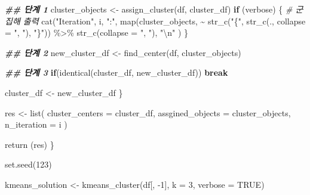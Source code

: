 \documentclass[
]{book}
\newenvironment{Shaded}{\begin{snugshade}}{\end{snugshade}}
\newcommand{\AttributeTok}[1]{\textcolor[rgb]{0.77,0.63,0.00}{#1}}
\newcommand{\CommentTok}[1]{\textcolor[rgb]{0.56,0.35,0.01}{\textit{#1}}}
\newcommand{\ConstantTok}[1]{\textcolor[rgb]{0.00,0.00,0.00}{#1}}
\newcommand{\ControlFlowTok}[1]{\textcolor[rgb]{0.13,0.29,0.53}{\textbf{#1}}}
\newcommand{\DecValTok}[1]{\textcolor[rgb]{0.00,0.00,0.81}{#1}}
\newcommand{\DocumentationTok}[1]{\textcolor[rgb]{0.56,0.35,0.01}{\textbf{\textit{#1}}}}
\newcommand{\FunctionTok}[1]{\textcolor[rgb]{0.00,0.00,0.00}{#1}}
\newcommand{\NormalTok}[1]{#1}
\newcommand{\OtherTok}[1]{\textcolor[rgb]{0.56,0.35,0.01}{#1}}
\newcommand{\SpecialCharTok}[1]{\textcolor[rgb]{0.00,0.00,0.00}{#1}}
\newcommand{\StringTok}[1]{\textcolor[rgb]{0.31,0.60,0.02}{#1}}
\begin{document}
\begin{Shaded}
\begin{Highlighting}[]
    \DocumentationTok{\#\# 단계 1}
\NormalTok{    cluster\_objects }\OtherTok{\textless{}{-}} \FunctionTok{assign\_cluster}\NormalTok{(df, cluster\_df)}
    \ControlFlowTok{if}\NormalTok{ (verbose) \{ }\CommentTok{\# 군집해 출력}
      \FunctionTok{cat}\NormalTok{(}\StringTok{"Iteration"}\NormalTok{, i, }\StringTok{":"}\NormalTok{, }
          \FunctionTok{map}\NormalTok{(cluster\_objects, }\SpecialCharTok{\textasciitilde{}} \FunctionTok{str\_c}\NormalTok{(}\StringTok{"\{"}\NormalTok{, }\FunctionTok{str\_c}\NormalTok{(., }\AttributeTok{collapse =} \StringTok{", "}\NormalTok{), }\StringTok{"\}"}\NormalTok{)) }\SpecialCharTok{\%\textgreater{}\%}
            \FunctionTok{str\_c}\NormalTok{(}\AttributeTok{collapse =} \StringTok{", "}\NormalTok{),}
          \StringTok{"}\SpecialCharTok{\textbackslash{}n}\StringTok{"}
\NormalTok{      )}
\NormalTok{    \}}
    
    \DocumentationTok{\#\# 단계 2}
\NormalTok{    new\_cluster\_df }\OtherTok{\textless{}{-}} \FunctionTok{find\_center}\NormalTok{(df, cluster\_objects)}

    \DocumentationTok{\#\# 단계 3}
    \ControlFlowTok{if}\NormalTok{(}\FunctionTok{identical}\NormalTok{(cluster\_df, new\_cluster\_df)) }\ControlFlowTok{break}
    
\NormalTok{    cluster\_df }\OtherTok{\textless{}{-}}\NormalTok{ new\_cluster\_df}
\NormalTok{  \}}
  
\NormalTok{  res }\OtherTok{\textless{}{-}} \FunctionTok{list}\NormalTok{(}
    \AttributeTok{cluster\_centers =}\NormalTok{ cluster\_df,}
    \AttributeTok{assgined\_objects =}\NormalTok{ cluster\_objects,}
    \AttributeTok{n\_iteration =}\NormalTok{ i}
\NormalTok{  )}
  
  \FunctionTok{return}\NormalTok{ (res)}
\NormalTok{\}}
\end{Highlighting}
\end{Shaded}

\begin{Shaded}
\begin{Highlighting}[]
\FunctionTok{set.seed}\NormalTok{(}\DecValTok{123}\NormalTok{)}

\NormalTok{kmeans\_solution }\OtherTok{\textless{}{-}} \FunctionTok{kmeans\_cluster}\NormalTok{(df[, }\SpecialCharTok{{-}}\DecValTok{1}\NormalTok{], }\AttributeTok{k =} \DecValTok{3}\NormalTok{, }\AttributeTok{verbose =} \ConstantTok{TRUE}\NormalTok{)}
\end{Highlighting}
\end{Shaded}
\end{document}
